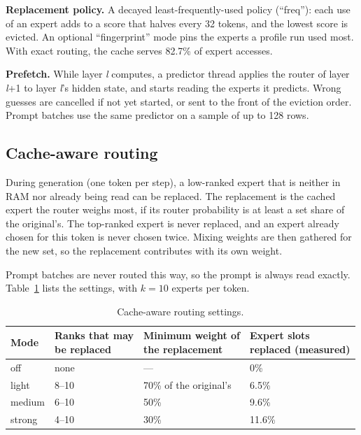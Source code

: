 \textbf{Replacement policy.} A decayed least-frequently-used policy (``freq''): each use of an expert adds to a score that halves every 32 tokens, and the lowest score is evicted. An optional ``fingerprint'' mode pins the experts a profile run used most. With exact routing, the cache serves 82.7\% of expert accesses.

\textbf{Prefetch.} While layer \emph{l} computes, a predictor thread applies the router of layer \emph{l}+1 to layer \emph{l}'s hidden state, and starts reading the experts it predicts. Wrong guesses are cancelled if not yet started, or sent to the front of the eviction order. Prompt batches use the same predictor on a sample of up to 128 rows.

\subsection{Cache-aware routing}
During generation (one token per step), a low-ranked expert that is neither in RAM nor already being read can be replaced. The replacement is the cached expert the router weighs most, if its router probability is at least a set share of the original's. The top-ranked expert is never replaced, and an expert already chosen for this token is never chosen twice. Mixing weights are then gathered for the new set, so the replacement contributes with its own weight.

Prompt batches are never routed this way, so the prompt is always read exactly. Table~\ref{tab:modes} lists the settings, with $k=10$ experts per token.

\begin{table}[t]
\centering\small
\caption{Cache-aware routing settings.}\label{tab:modes}
\begin{tabular}{llll}
\toprule
Mode & \makecell[l]{Ranks that may\\be replaced} & \makecell[l]{Minimum weight of\\the replacement} & \makecell[l]{Expert slots\\replaced (measured)} \\
\midrule
off & none & --- & 0\% \\
light & 8--10 & 70\% of the original's & 6.5\% \\
medium & 6--10 & 50\% & 9.6\% \\
strong & 4--10 & 30\% & 11.6\% \\
\bottomrule
\end{tabular}
\end{table}

